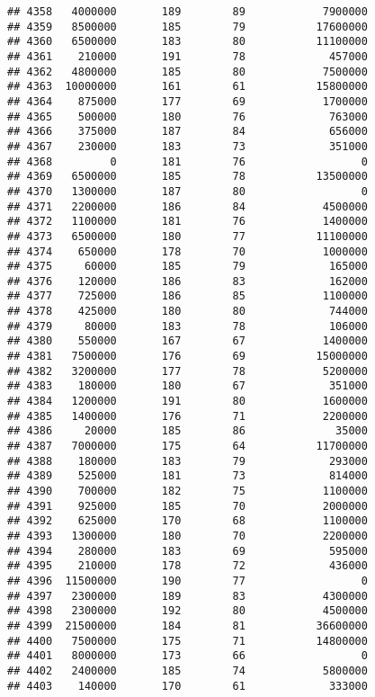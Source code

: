 \documentclass[
]{article}
\begin{document}
\begin{verbatim}
## 4358   4000000       189        89            7900000
## 4359   8500000       185        79           17600000
## 4360   6500000       183        80           11100000
## 4361    210000       191        78             457000
## 4362   4800000       185        80            7500000
## 4363  10000000       161        61           15800000
## 4364    875000       177        69            1700000
## 4365    500000       180        76             763000
## 4366    375000       187        84             656000
## 4367    230000       183        73             351000
## 4368         0       181        76                  0
## 4369   6500000       185        78           13500000
## 4370   1300000       187        80                  0
## 4371   2200000       186        84            4500000
## 4372   1100000       181        76            1400000
## 4373   6500000       180        77           11100000
## 4374    650000       178        70            1000000
## 4375     60000       185        79             165000
## 4376    120000       186        83             162000
## 4377    725000       186        85            1100000
## 4378    425000       180        80             744000
## 4379     80000       183        78             106000
## 4380    550000       167        67            1400000
## 4381   7500000       176        69           15000000
## 4382   3200000       177        78            5200000
## 4383    180000       180        67             351000
## 4384   1200000       191        80            1600000
## 4385   1400000       176        71            2200000
## 4386     20000       185        86              35000
## 4387   7000000       175        64           11700000
## 4388    180000       183        79             293000
## 4389    525000       181        73             814000
## 4390    700000       182        75            1100000
## 4391    925000       185        70            2000000
## 4392    625000       170        68            1100000
## 4393   1300000       180        70            2200000
## 4394    280000       183        69             595000
## 4395    210000       178        72             436000
## 4396  11500000       190        77                  0
## 4397   2300000       189        83            4300000
## 4398   2300000       192        80            4500000
## 4399  21500000       184        81           36600000
## 4400   7500000       175        71           14800000
## 4401   8000000       173        66                  0
## 4402   2400000       185        74            5800000
## 4403    140000       170        61             333000

\end{verbatim}
\end{document}

